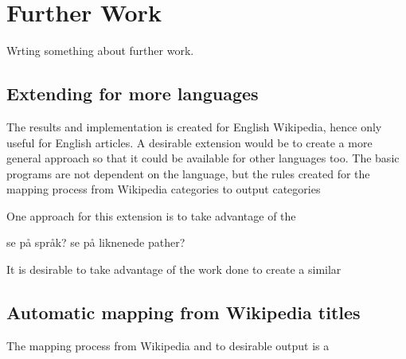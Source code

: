 \section{Further Work}
Wrting something about further work.

\subsection{Extending for more languages}
The results and implementation is created for English Wikipedia, hence only useful for English articles. A desirable extension would be to create a more general approach so that it could be available for other languages too. The basic programs are not dependent on the language, but the rules created for the mapping process from Wikipedia categories to output categories 

One approach for this extension is to take advantage of the 

se på språk?
se på liknenede pather?


It is desirable to take advantage of the work done to create a similar 

\subsection{Automatic mapping from Wikipedia titles}
The mapping process from Wikipedia and to desirable output is a 
